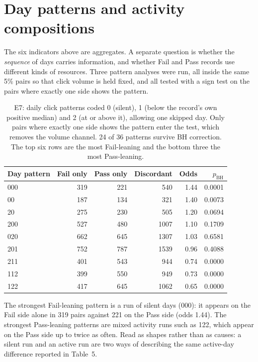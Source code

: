 \documentclass[11pt]{article}
\begin{document}
\section{Day patterns and activity compositions}
The six indicators above are aggregates. A separate question is whether the \emph{sequence} of days carries information, and whether Fail and Pass records use different kinds of resources. Three pattern analyses were run, all inside the same 5\% pairs so that click volume is held fixed, and all tested with a sign test on the pairs where exactly one side shows the pattern.
\begin{table}[t]
\centering
\scriptsize\setlength{\tabcolsep}{4pt}
\begin{tabular}{lrrrrr}
\toprule
Day pattern & Fail only & Pass only & Discordant & Odds & $p_{\mathrm{BH}}$ \\
\midrule
000 & 319 & 221 & 540 & 1.44 & 0.0001 \\
00 & 187 & 134 & 321 & 1.40 & 0.0073 \\
20 & 275 & 230 & 505 & 1.20 & 0.0694 \\
200 & 527 & 480 & 1007 & 1.10 & 0.1709 \\
020 & 662 & 645 & 1307 & 1.03 & 0.6581 \\
201 & 752 & 787 & 1539 & 0.96 & 0.4088 \\
211 & 401 & 543 & 944 & 0.74 & 0.0000 \\
112 & 399 & 550 & 949 & 0.73 & 0.0000 \\
122 & 417 & 645 & 1062 & 0.65 & 0.0000 \\
\bottomrule
\end{tabular}
\caption{E7: daily click patterns coded 0 (silent), 1 (below the record's own positive median) and 2 (at or above it), allowing one skipped day. Only pairs where exactly one side shows the pattern enter the test, which removes the volume channel. 24 of 36 patterns survive BH correction. The top six rows are the most Fail-leaning and the bottom three the most Pass-leaning.}
\label{tab:e7}
\end{table}
The strongest Fail-leaning pattern is a run of silent days (000): it appears on the Fail side alone in 319 pairs against 221 on the Pass side (odds 1.44). The strongest Pass-leaning patterns are mixed activity runs such as 122, which appear on the Pass side up to twice as often. Read as shapes rather than as causes: a silent run and an active run are two ways of describing the same active-day difference reported in Table~5.
\end{document}
